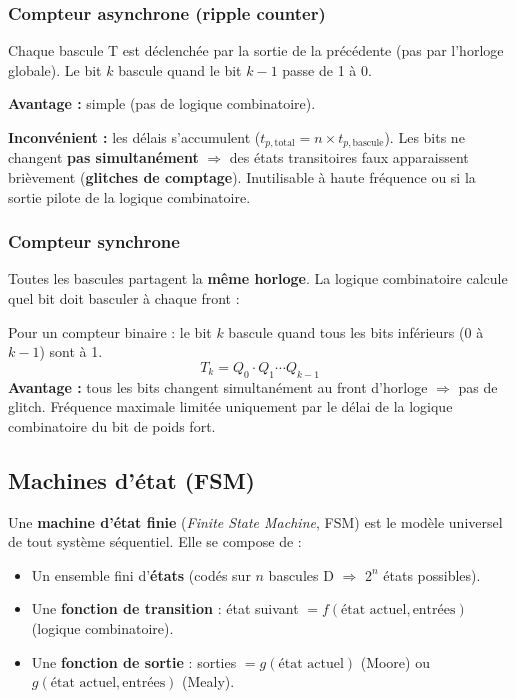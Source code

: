 \documentclass[12pt,a4paper,twoside]{book}
\begin{document}
\subsubsection*{Compteur asynchrone (ripple counter)}

\begin{formule}
Chaque bascule T est déclenchée par la sortie de la précédente (pas par l'horloge globale). Le bit $k$ bascule quand le bit $k-1$ passe de 1 à 0.

\textbf{Avantage :} simple (pas de logique combinatoire).

\textbf{Inconvénient :} les délais s'accumulent ($t_{p,\text{total}} = n \times t_{p,\text{bascule}}$). Les bits ne changent \textbf{pas simultanément} $\Rightarrow$ des états transitoires faux apparaissent brièvement (\textbf{glitches de comptage}). Inutilisable à haute fréquence ou si la sortie pilote de la logique combinatoire.
\end{formule}

\subsubsection*{Compteur synchrone}

\begin{formule}
Toutes les bascules partagent la \textbf{même horloge}. La logique combinatoire calcule quel bit doit basculer à chaque front :

Pour un compteur binaire : le bit $k$ bascule quand tous les bits inférieurs ($0$ à $k-1$) sont à 1.
\[
T_k = Q_0 \cdot Q_1 \cdots Q_{k-1}
\]
\textbf{Avantage :} tous les bits changent simultanément au front d'horloge $\Rightarrow$ pas de glitch. Fréquence maximale limitée uniquement par le délai de la logique combinatoire du bit de poids fort.
\end{formule}

\subsection{Machines d'état (FSM)}

Une \textbf{machine d'état finie} (\textit{Finite State Machine}, FSM) est le modèle universel de tout système séquentiel. Elle se compose de :

\begin{formule}
\begin{itemize}[nosep]
\item Un ensemble fini d'\textbf{états} (codés sur $n$ bascules D $\Rightarrow$ $2^n$ états possibles).
\item Une \textbf{fonction de transition} : état suivant $= f(\text{état actuel}, \text{entrées})$ (logique combinatoire).
\item Une \textbf{fonction de sortie} : sorties $= g(\text{état actuel})$ (Moore) ou $g(\text{état actuel}, \text{entrées})$ (Mealy).
\end{itemize}
\end{formule}
\end{document}
